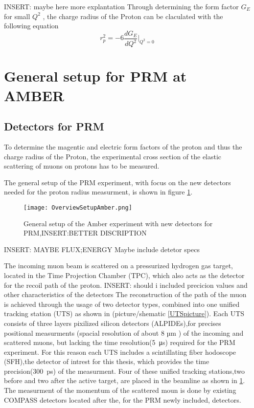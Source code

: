  INSERT: maybe  here more explantation 
  \newline
Through determining the form factor $G_E$ for small $Q^2$ , the charge radius of the Proton can be claculated with the following equation \autocite{intentAmber}
\begin{equation}
\label{eq:charge_radius}
r_p^2 = -6 \frac{dG_E}{dQ^2} \bigg|_{Q^2 = 0}
\end{equation}

\section{General setup for PRM at AMBER }\label{sec:general_setup}
\subsection{Detectors for PRM}
To determine the magentic and electric form factors of the proton and thus the charge radius of the Proton,
 the experimental cross section of the elastic scattering of muons on protons has to be measured.

The general setup of the PRM experiment, with focus on the new detectors needed for the proton radius measurment, is shown in figure \ref{fig:amber_setup}.
\begin{figure}[H]
	\centering
	\texttt{[image: OverviewSetupAmber.png]}
	\caption{General setup of the Amber experiment with new detectors for PRM,INSERT:BETTER DISCRIPTION \autocite{ProposalAmber}}
	\label{fig:amber_setup}
\end{figure}
INSERT: MAYBE FLUX;ENERGY Maybe include detetor specs 

The incoming muon beam is scattered on a pressurized hydrogen gas target, located in the Time Projection Chamber (TPC), 
which also acts as the detector for the recoil path of the proton.
INSERT: should i included precicion values and other characteristics of the detectors
The reconstruction of the path of the muon is achieved through the usage of two detector types,
combined into one unified tracking station (UTS) as shown in (picture/shematic \ref{UTSpicture}).
\newline
Each UTS consists of three layers pixilized silicon detectors (ALPIDEs),for precises positional measurments (spacial resolution of about 8 µm \autocite{Karlseminar}) of the incoming and scattered muons, 
but lacking the time resolution(\SI{5}{\micro\second}\autocite{Amber2022Status}) required for the PRM experiment.
For this reason each UTS includes a scintillating fiber hodoscope (SFH),the detector of intrest for this thesis, which provides the time precision(\SI{300}{\pico\second}\Autocite{Amber2022Status}) of the measurment.
Four of these unified tracking stations,two before and two after the active target, are placed in the beamline as shown in \ref{fig:amber_setup}.
The measurment of the momentum of the scattered moun is done by existing COMPASS detectors located after the, 
for the PRM newly included, detectors\autocite{ProposalAmber}.

